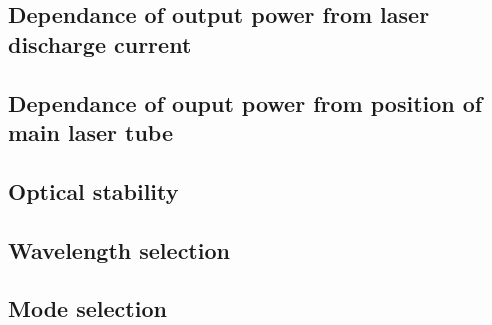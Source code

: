 \documentclass[../main.tex]{subfiles}
\begin{document}
\subsection{Dependance of output power from laser discharge current}
    

\subsection{Dependance of ouput power from position of main laser tube}
    

\subsection{Optical stability}
    

\subsection{Wavelength selection}
    

\subsection{Mode selection}

\end{document}

